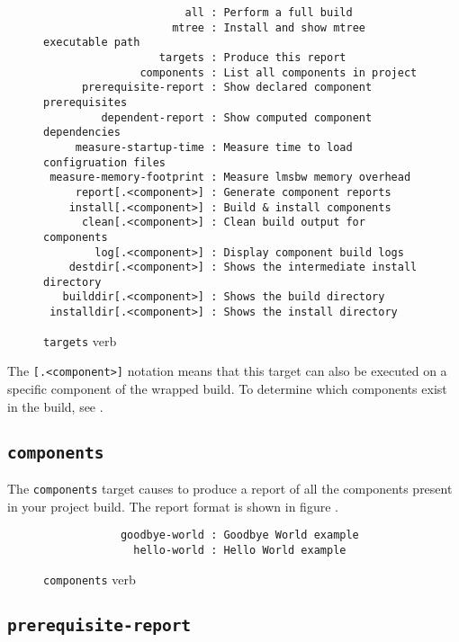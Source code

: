 \begin{figure}[tbh]
\hrulefill
\begin{footnotesize}
\begin{verbatim}
                      all : Perform a full build
                    mtree : Install and show mtree executable path
                  targets : Produce this report
               components : List all components in project
      prerequisite-report : Show declared component prerequisites
         dependent-report : Show computed component dependencies
     measure-startup-time : Measure time to load configruation files
 measure-memory-footprint : Measure lmsbw memory overhead
     report[.<component>] : Generate component reports
    install[.<component>] : Build & install components
      clean[.<component>] : Clean build output for components
        log[.<component>] : Display component build logs
    destdir[.<component>] : Shows the intermediate install directory
   builddir[.<component>] : Shows the build directory
 installdir[.<component>] : Shows the install directory
\end{verbatim}
\end{footnotesize}
\hrulefill
\caption{\texttt{targets} verb}\label{usinglmsbw:targets-verb}
\end{figure}

The \texttt{[.<component>]} notation means that this target can also
be executed on a specific component of the wrapped build.  To
determine which components exist in the build, see
.

\subsection{\texttt{components}}\label{lmsbw:target:components}

The \texttt{components} target causes \lmsbw to produce a report of all
the components present in your project build.  The report format is
shown in figure .

\begin{figure}[tbh]
\hrulefill
\begin{verbatim}
            goodbye-world : Goodbye World example
              hello-world : Hello World example
\end{verbatim}
\hrulefill
\caption{\texttt{components} verb}\label{usinglmsbw:components-verb}
\end{figure}

\subsection{\texttt{prerequisite-report}}

